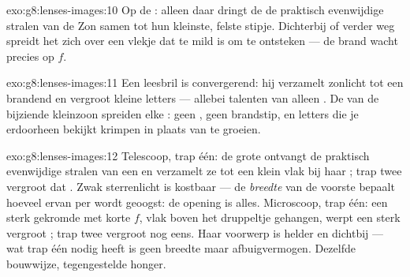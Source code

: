 \begin{solution}{exo:g8:lenses-images:10}
Op de : alleen daar dringt de
 de praktisch evenwijdige stralen van de Zon samen tot hun
kleinste, felste stipje. Dichterbij of verder weg spreidt het
 zich over een vlekje dat te mild is om te ontsteken --- de
brand wacht precies op $f$.
\end{solution}

\begin{solution}{exo:g8:lenses-images:11}
Een leesbril is convergerend: hij verzamelt zonlicht tot een brandend
 en vergroot kleine letters --- allebei talenten van alleen
. De  van de bijziende
kleinzoon spreiden elke : geen , geen brandstip,
en letters die je erdoorheen bekijkt krimpen in plaats van te groeien.
\end{solution}

\begin{solution}{exo:g8:lenses-images:12}
Telescoop, trap één: de grote  ontvangt de praktisch
evenwijdige stralen van een  en verzamelt ze tot een klein
 vlak bij haar ; trap twee vergroot dat
. Zwak sterrenlicht is kostbaar --- de \emph{breedte} van
de voorste  bepaalt hoeveel ervan per
 wordt geoogst: de opening is alles. Microscoop, trap één:
een sterk gekromde  met korte $f$, vlak boven het
druppeltje gehangen, werpt een sterk vergroot ; trap
twee vergroot nog eens. Haar voorwerp is helder en dichtbij --- wat
trap één nodig heeft is geen breedte maar afbuigvermogen. Dezelfde
bouwwijze, tegengestelde honger.
\end{solution}

